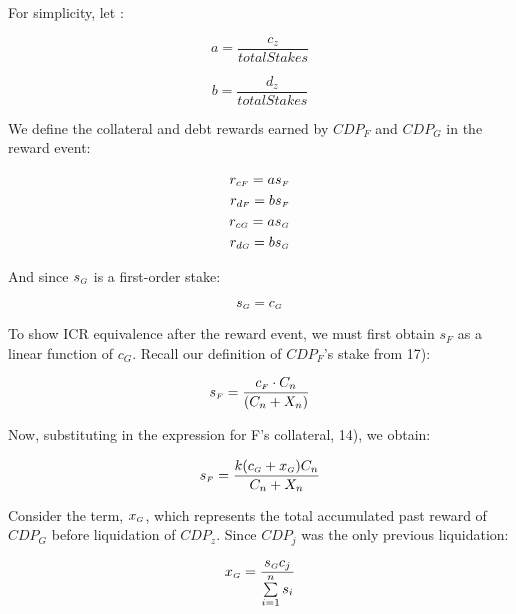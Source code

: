 \documentclass[reqno]{article}
\begin{document}
For simplicity, let :

\begin{equation} 
    a=\frac{c_z}{totalStakes}
\end{equation}

\begin{equation} 
    b=\frac{d_z}{totalStakes}
\end{equation}

\bigskip
We define the collateral and debt rewards earned by $CDP_F$ and $CDP_G$ in the reward event:

\begin{equation}
    \begin{split}
        r_{c\mathsmaller{F}}=as_\mathsmaller{F}\\
        r_{d\mathsmaller{F}}=bs_\mathsmaller{F}\\
        r_{c\mathsmaller{G}}=as_\mathsmaller{G}\\
        r_{d\mathsmaller{G}}=bs_\mathsmaller{G}
    \end{split}
\end{equation}

\bigskip
And since $s_\mathsmaller{G}$ is a first-order stake:

\begin{equation} 
    s_\mathsmaller{G}=c_\mathsmaller{G}
\end{equation}

\bigskip
To show ICR equivalence after the reward event, we must first obtain $s_F$ as a linear function of $c_G$. Recall our definition of $CDP_F$’s stake from 17):

\begin{equation} 
    s_\mathsmaller{F}=\frac{c_\mathsmaller{F} \cdot C_n}{(C_n+X_n)}
\end{equation}

\bigskip
Now, substituting in the expression for F’s collateral, 14), we obtain:

\begin{equation} 
    s_\mathsmaller{F}=\frac{k(c_\mathsmaller{G}+x_\mathsmaller{G})C_n}{C_n+X_n}
\end{equation}

\bigskip
Consider the term, $x_\mathsmaller{G}$, which represents the total accumulated past reward of $CDP_G$ before liquidation of $CDP_z$.  Since $CDP_j$ was the only previous liquidation:

\begin{equation} 
    x_\mathsmaller{G}=\frac{s_\mathsmaller{G}c_j}{\sum\limits^n_{i=1}s_i}
\end{equation}
\end{document}
